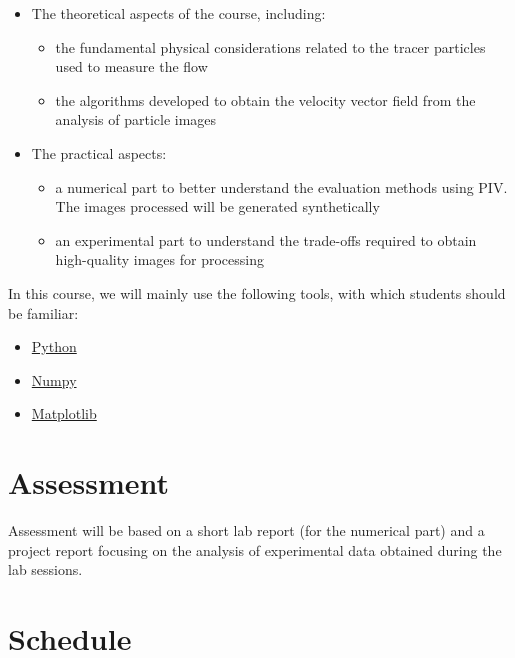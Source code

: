 \documentclass[
  english,
  letterpaper,
  numbers=noendperiod,
  DIV=13]{scrreprt}
\providecommand{\tightlist}{%
  \setlength{\itemsep}{0pt}\setlength{\parskip}{0pt}}
\begin{document}
\begin{itemize}
\tightlist
\item
  The theoretical aspects of the course, including:

  \begin{itemize}
  \tightlist
  \item
    the fundamental physical considerations related to the tracer
    particles used to measure the flow
  \item
    the algorithms developed to obtain the velocity vector field from
    the analysis of particle images
  \end{itemize}
\item
  The practical aspects:

  \begin{itemize}
  \tightlist
  \item
    a numerical part to better understand the evaluation methods using
    PIV. The images processed will be generated synthetically
  \item
    an experimental part to understand the trade-offs required to obtain
    high-quality images for processing
  \end{itemize}
\end{itemize}

In this course, we will mainly use the following tools, with which
students should be familiar:

\begin{itemize}
\tightlist
\item
  \href{https://www.python.org/}{Python}
\item
  \href{https://numpy.org}{Numpy}
\item
  \href{https://matplotlib.org}{Matplotlib}
\end{itemize}


\chapter*{Assessment}\label{assessment}


Assessment will be based on a short lab report (for the numerical part)
and a project report focusing on the analysis of experimental data
obtained during the lab sessions.


\chapter*{Schedule}\label{schedule}
\end{document}
